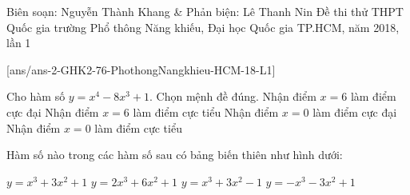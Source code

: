 \begin{name}
{Biên soạn: Nguyễn Thành Khang \& Phản biện: Lê Thanh Nin}
{Đề thi thử THPT Quốc gia trường Phổ thông Năng khiếu, Đại học Quốc gia TP.HCM, năm 2018, lần 1}
\end{name}
\setcounter{ex}{0}\setcounter{bt}{0}
[ans/ans-2-GHK2-76-PhothongNangkhieu-HCM-18-L1]
\begin{ex}%
Cho hàm số $y=x^4-8x^3+1$. Chọn mệnh đề đúng.
\choice
{Nhận điểm $x=6$ làm điểm cực đại}
{\True Nhận điểm $x=6$ làm điểm cực tiểu}
{Nhận điểm $x=0$ làm điểm cực đại}
{Nhận điểm $x=0$ làm điểm cực tiểu}
\end{ex}

\begin{ex}%
Hàm số nào trong các hàm số sau có bảng biến thiên như hình dưới:
\begin{center}
\end{center}
\choice
{$y=x^3+3x^2+1$}
{$y=2x^3+6x^2+1$}
{$y=x^3+3x^2-1$}
{\True $y=-x^3-3x^2+1$}
\end{ex}

